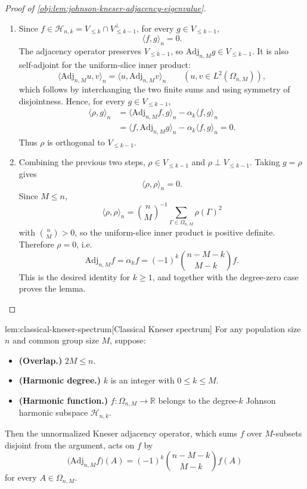 \documentclass[11pt]{article}
\begin{document}
\begin{proof}[Proof of \cref{obj:lem:johnson-kneser-adjacency-eigenvalue}]
\begin{enumerate}
\item Since \(f\in\mathcal H_{n,k}=V_{\le k}\cap V_{\le k-1}^{\perp}\), for every \(g\in V_{\le k-1}\),
\[
\langle f,g\rangle_n=0.
\]
The adjacency operator preserves \(V_{\le k-1}\), so \(\mathrm{Adj}_{n,M}g\in V_{\le k-1}\). It is also self-adjoint for the uniform-slice inner product:
\[
\langle \mathrm{Adj}_{n,M}u,v\rangle_n
=
\langle u,\mathrm{Adj}_{n,M}v\rangle_n
\qquad
(u,v\in L^2(\Omega_{n,M})),
\]
which follows by interchanging the two finite sums and using symmetry of disjointness. Hence, for every \(g\in V_{\le k-1}\),
\[
\begin{aligned}
\langle \rho,g\rangle_n
&=
\langle \mathrm{Adj}_{n,M}f,g\rangle_n-\alpha_k\langle f,g\rangle_n  \\
&=
\langle f,\mathrm{Adj}_{n,M}g\rangle_n-\alpha_k\langle f,g\rangle_n
=
0.
\end{aligned}
\]
Thus \(\rho\) is orthogonal to \(V_{\le k-1}\). %

\item Combining the previous two steps, \(\rho\in V_{\le k-1}\) and \(\rho\perp V_{\le k-1}\). Taking \(g=\rho\) gives
\[
\langle \rho,\rho\rangle_n=0.
\]
Since \(M\le n\),
\[
\langle \rho,\rho\rangle_n
=
\binom nM^{-1}\sum_{\Gamma\in\Omega_{n,M}}\rho(\Gamma)^2
\]
with \(\binom nM>0\), so the uniform-slice inner product is positive definite. Therefore \(\rho=0\), i.e.
\[
\mathrm{Adj}_{n,M}f=\alpha_k f
=
(-1)^k\binom{n-M-k}{M-k}f.
\]
This is the desired identity for \(k\ge 1\), and together with the degree-zero case proves the lemma. %
\end{enumerate}
\end{proof}

\begin{lemmav}{lem:classical-kneser-spectrum}[Classical Kneser spectrum]
For any population size \(n\) and common group size \(M\), suppose:
\begin{itemize}
\item \textbf{(Overlap.)} \(2M\le n\).
\item \textbf{(Harmonic degree.)} \(k\) is an integer with \(0\le k\le M\).
\item \textbf{(Harmonic function.)} \(f:\Omega_{n,M}\to\mathbb R\) belongs to the degree-\(k\) Johnson harmonic subspace \(\mathcal H_{n,k}\).
\end{itemize}
Then the unnormalized Kneser adjacency operator, which sums \(f\) over \(M\)-subsets disjoint from the argument, acts on \(f\) by
\[
\bigl(\mathrm{Adj}_{n,M} f\bigr)(A)
=
(-1)^k \binom{n-M-k}{M-k} f(A)
\]
for every \(A\in\Omega_{n,M}\).
\end{lemmav}
\end{document}
